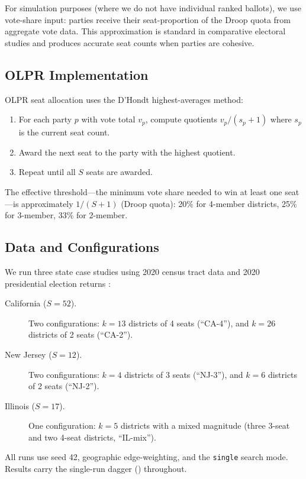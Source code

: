 For simulation purposes (where we do not have individual ranked ballots), we
use vote-share input: parties receive their seat-proportion of the Droop quota
from aggregate vote data.  This approximation is standard in comparative
electoral studies \citep{gallagher1991proportionality} and produces accurate
seat counts when parties are cohesive.

\subsection{OLPR Implementation}

OLPR seat allocation uses the D'Hondt highest-averages method:

\begin{enumerate}
  \item For each party $p$ with vote total $v_p$, compute quotients
        $v_p / (s_p + 1)$ where $s_p$ is the current seat count.
  \item Award the next seat to the party with the highest quotient.
  \item Repeat until all $S$ seats are awarded.
\end{enumerate}

The effective threshold---the minimum vote share needed to win at least one
seat---is approximately $1/(S+1)$ (Droop quota): 20\% for 4-member districts,
25\% for 3-member, 33\% for 2-member.

\subsection{Data and Configurations}

We run three state case studies using 2020 census tract data and 2020
presidential election returns \citep{MEDSL2020}:

\begin{description}
  \item[California ($S=52$).] Two configurations: $k=13$ districts of 4
    seats (``CA-4''), and $k=26$ districts of 2 seats (``CA-2'').
  \item[New Jersey ($S=12$).] Two configurations: $k=4$ districts of 3 seats
    (``NJ-3''), and $k=6$ districts of 2 seats (``NJ-2'').
  \item[Illinois ($S=17$).] One configuration: $k=5$ districts with a
    mixed magnitude (three 3-seat and two 4-seat districts, ``IL-mix'').
\end{description}

All runs use seed 42, geographic edge-weighting, and the \texttt{single}
search mode.  Results carry the single-run dagger (\singrun) throughout.
